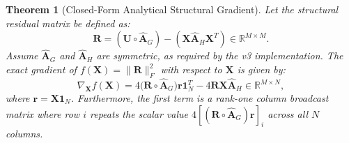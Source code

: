 \documentclass[conference]{IEEEtran}
\newtheorem{theorem}{Theorem}
\begin{document}
\begin{theorem}[Closed-Form Analytical Structural Gradient]
\label{thm:gradient}
Let the structural residual matrix be defined as:
\begin{equation}
\mathbf{R} = (\mathbf{U} \circ \hat{\mathbf{A}}_G) - (\mathbf{X}\hat{\mathbf{A}}_H\mathbf{X}^T) \in \mathbb{R}^{M \times M}.
\label{eq:residual}
\end{equation}
Assume $\hat{\mathbf{A}}_G$ and $\hat{\mathbf{A}}_H$ are symmetric, as required by the v3 implementation.
The exact gradient of $f(\mathbf{X}) = \|\mathbf{R}\|_F^2$ with respect to $\mathbf{X}$ is given by:
\begin{equation}
\nabla_{\mathbf{X}} f(\mathbf{X}) = 4\big(\mathbf{R} \circ \hat{\mathbf{A}}_G\big)\mathbf{r}\mathbf{1}_N^T - 4\mathbf{R}\mathbf{X}\hat{\mathbf{A}}_H \in \mathbb{R}^{M \times N},
\label{eq:thm1_result}
\end{equation}
where $\mathbf{r} = \mathbf{X}\mathbf{1}_N$. Furthermore, the first term is a rank-one column broadcast matrix where row $i$ repeats the scalar value $4[(\mathbf{R} \circ \hat{\mathbf{A}}_G)\mathbf{r}]_i$ across all $N$ columns.
\end{theorem}
\end{document}
